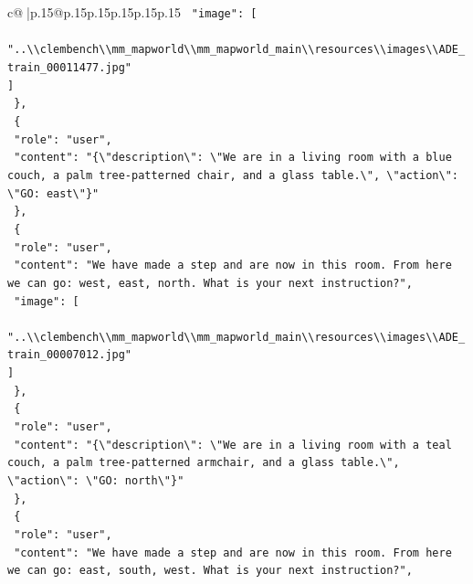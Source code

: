 \documentclass{article}
\begin{document}
{\begin{supertabular}{c@{$\;$}|p{.15\linewidth}@{}p{.15\linewidth}p{.15\linewidth}p{.15\linewidth}p{.15\linewidth}p{.15\linewidth}}
{{{\texttt{    "image": {[}} \\
\texttt{      "..\textbackslash{}\textbackslash{}clembench\textbackslash{}\textbackslash{}mm\_mapworld\textbackslash{}\textbackslash{}mm\_mapworld\_main\textbackslash{}\textbackslash{}resources\textbackslash{}\textbackslash{}images\textbackslash{}\textbackslash{}ADE\_train\_00011477.jpg"} \\
\texttt{    {]}} \\
\texttt{  \},} \\
\texttt{  \{} \\
\texttt{    "role": "user",} \\
\texttt{    "content": "\{\textbackslash{}"description\textbackslash{}": \textbackslash{}"We are in a living room with a blue couch, a palm tree{-}patterned chair, and a glass table.\textbackslash{}", \textbackslash{}"action\textbackslash{}": \textbackslash{}"GO: east\textbackslash{}"\}"} \\
\texttt{  \},} \\
\texttt{  \{} \\
\texttt{    "role": "user",} \\
\texttt{    "content": "We have made a step and are now in this room. From here we can go: west, east, north. What is your next instruction?",} \\
\texttt{    "image": {[}} \\
\texttt{      "..\textbackslash{}\textbackslash{}clembench\textbackslash{}\textbackslash{}mm\_mapworld\textbackslash{}\textbackslash{}mm\_mapworld\_main\textbackslash{}\textbackslash{}resources\textbackslash{}\textbackslash{}images\textbackslash{}\textbackslash{}ADE\_train\_00007012.jpg"} \\
\texttt{    {]}} \\
\texttt{  \},} \\
\texttt{  \{} \\
\texttt{    "role": "user",} \\
\texttt{    "content": "\{\textbackslash{}"description\textbackslash{}": \textbackslash{}"We are in a living room with a teal couch, a palm tree{-}patterned armchair, and a glass table.\textbackslash{}", \textbackslash{}"action\textbackslash{}": \textbackslash{}"GO: north\textbackslash{}"\}"} \\
\texttt{  \},} \\
\texttt{  \{} \\
\texttt{    "role": "user",} \\
\texttt{    "content": "We have made a step and are now in this room. From here we can go: east, south, west. What is your next instruction?",} \\
}}}
\end{supertabular}}
\end{document}

